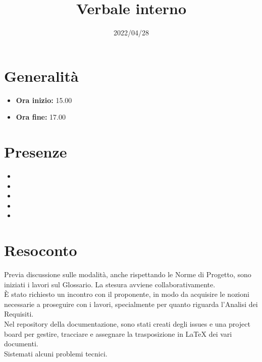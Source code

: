 \documentclass{classes/base}
\title{Verbale interno}
\date{2022/04/28}
\author{\marcov}
\renewcommand{\maketitle}{
    
}
\begin{document}
    \maketitle

    \section*{Generalità}
    \begin{itemize}
        \item \textbf{Ora inizio:} 15.00
        \item \textbf{Ora fine:} 17.00
    \end{itemize}

    \section*{Presenze}
    \begin{itemize}
        \item \marcob
        \item \marcov
        \item \angela
        \item \giulio
        \item \matteo
    \end{itemize}

    \section*{Resoconto}
    Previa discussione sulle modalità, anche rispettando le Norme di Progetto, sono iniziati i lavori sul Glossario. La stesura avviene collaborativamente.\\
    È stato richiesto un incontro con il proponente, in modo da acquisire le nozioni necessarie a proseguire con i lavori, specialmente per quanto riguarda l'Analisi dei Requisiti.\\
    Nel repository della documentazione, sono stati creati degli issues e una project board per gestire, tracciare e assegnare la trasposizione in \LaTeX{} dei vari documenti.\\
    Sistemati alcuni problemi tecnici.
\end{document}
